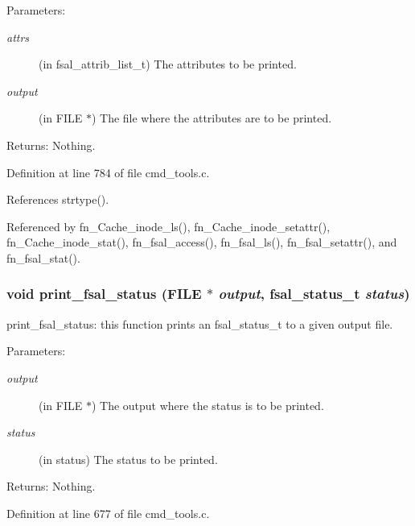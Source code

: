 \begin{Desc}
\item[Parameters:]
\begin{description}
\item[{\em attrs}](in fsal\_\-attrib\_\-list\_\-t) The attributes to be printed. \item[{\em output}](in FILE $\ast$) The file where the attributes are to be printed. \end{description}
\end{Desc}
\begin{Desc}
\item[Returns:]Nothing. \end{Desc}


Definition at line 784 of file cmd\_\-tools.c.

References strtype().

Referenced by fn\_\-Cache\_\-inode\_\-ls(), fn\_\-Cache\_\-inode\_\-setattr(), fn\_\-Cache\_\-inode\_\-stat(), fn\_\-fsal\_\-access(), fn\_\-fsal\_\-ls(), fn\_\-fsal\_\-setattr(), and fn\_\-fsal\_\-stat().
\subsubsection{\setlength{\rightskip}{0pt plus 5cm}void print\_\-fsal\_\-status (FILE $\ast$ {\em output}, fsal\_\-status\_\-t {\em status})}\label{cmd__tools_8c_a13}


print\_\-fsal\_\-status: this function prints an fsal\_\-status\_\-t to a given output file.

\begin{Desc}
\item[Parameters:]
\begin{description}
\item[{\em output}](in FILE $\ast$) The output where the status is to be printed. \item[{\em status}](in status) The status to be printed.\end{description}
\end{Desc}
\begin{Desc}
\item[Returns:]Nothing. \end{Desc}


Definition at line 677 of file cmd\_\-tools.c.

